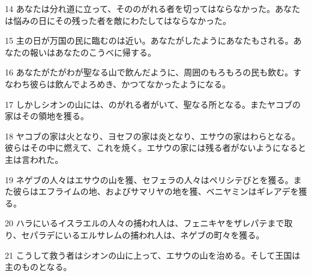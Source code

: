 \par 14 あなたは分れ道に立って、そののがれる者を切ってはならなかった。あなたは悩みの日にその残った者を敵にわたしてはならなかった。
\par 15 主の日が万国の民に臨むのは近い。あなたがしたようにあなたもされる。あなたの報いはあなたのこうべに帰する。
\par 16 あなたがたがわが聖なる山で飲んだように、周囲のもろもろの民も飲む。すなわち彼らは飲んでよろめき、かつてなかったようになる。
\par 17 しかしシオンの山には、のがれる者がいて、聖なる所となる。またヤコブの家はその領地を獲る。
\par 18 ヤコブの家は火となり、ヨセフの家は炎となり、エサウの家はわらとなる。彼らはその中に燃えて、これを焼く。エサウの家には残る者がないようになると主は言われた。
\par 19 ネゲブの人々はエサウの山を獲、セフェラの人々はペリシテびとを獲る。また彼らはエフライムの地、およびサマリヤの地を獲、ベニヤミンはギレアデを獲る。
\par 20 ハラにいるイスラエルの人々の捕われ人は、フェニキヤをザレパテまで取り、セパラデにいるエルサレムの捕われ人は、ネゲブの町々を獲る。
\par 21 こうして救う者はシオンの山に上って、エサウの山を治める。そして王国は主のものとなる。


